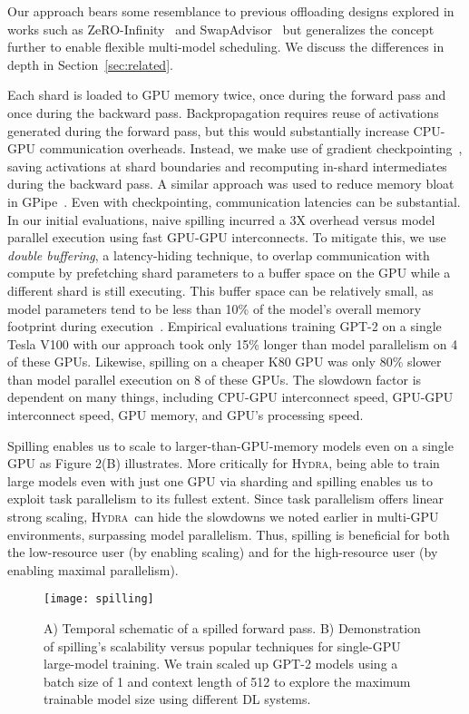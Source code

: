\documentclass{article}
\newcommand{\system}{\textsc{Hydra}}
\begin{document}
{{Our approach bears some resemblance to previous offloading designs explored in works such as ZeRO-Infinity~\cite{zeroInfinity} and SwapAdvisor~\cite{huang2020swapadvisor} but generalizes the concept further to enable flexible multi-model scheduling. We discuss the differences in depth in Section~\ref{sec:related}. 

Each shard is loaded to GPU memory twice, once during the forward pass and once during the backward pass. Backpropagation requires reuse of activations generated during the forward pass, but this would substantially increase CPU-GPU communication overheads. Instead, we make use of gradient checkpointing~\cite{chen2016training}, saving activations at shard boundaries and recomputing in-shard intermediates during the backward pass. A similar approach was used to reduce memory bloat in GPipe~\cite{gpipe}. 
Even with checkpointing, communication latencies can be substantial. In our initial evaluations, naive spilling incurred a 3X overhead versus model parallel execution using fast GPU-GPU interconnects. To mitigate this, we use \textit{double buffering}, a latency-hiding technique, to overlap communication with compute by prefetching shard parameters to a buffer space on the GPU while a different shard is still executing. This buffer space can be relatively small, as model parameters tend to be less than 10\% of the model's overall memory footprint during execution~\cite{gpipe, zeroOpt, l2l}. Empirical evaluations training GPT-2 on a single Tesla V100 with our approach took only 15\% longer than model parallelism on 4 of these GPUs. Likewise, spilling on a cheaper K80 GPU was only 80\% slower than model parallel execution on 8 of these GPUs. The slowdown factor is dependent on many things, including CPU-GPU interconnect speed, GPU-GPU interconnect speed, GPU memory, and GPU's processing speed.

Spilling enables us to scale to larger-than-GPU-memory models even on a single GPU as Figure 2(B) illustrates. More critically for \system, being able to train large models even with just one GPU via sharding and spilling enables us to exploit task parallelism to its fullest extent. Since task parallelism offers linear strong scaling, \system~can hide the slowdowns we noted earlier in multi-GPU environments, surpassing model parallelism. Thus, spilling is beneficial for both the low-resource user (by enabling scaling) and for the high-resource user (by enabling maximal parallelism).

\begin{figure}
 \label{fig:spilling}
  \centering
  \texttt{[image: spilling]}
  \caption{A) Temporal schematic of a spilled forward pass. B) Demonstration of spilling's scalability versus popular techniques for single-GPU large-model training. We train scaled up GPT-2 models using a batch size of 1 and context length of 512 to explore the maximum trainable model size using different DL systems.}


\end{figure}}}
\end{document}
